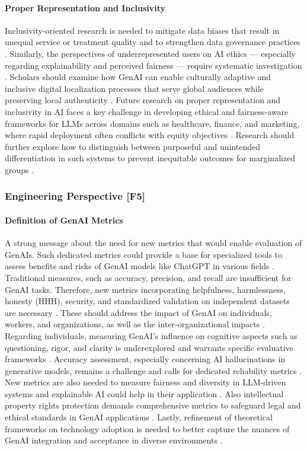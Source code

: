 \paragraph{Proper Representation and Inclusivity}
Inclusivity-oriented research is needed to mitigate data biases that result in unequal service or treatment quality and to strengthen data governance practices \parencite{R01, R09, S11}. Similarly, the perspectives of underrepresented users on AI ethics — especially regarding explainability and perceived fairness — require systematic investigation \parencite{S09}.
Scholars should examine how GenAI can enable culturally adaptive and inclusive digital localization processes that serve global audiences while preserving local authenticity \parencite{R03}. 
Future research on proper representation and inclusivity in AI faces a key challenge in developing ethical and fairness-aware frameworks for LLMs across domains such as healthcare, finance, and marketing, where rapid deployment often conflicts with equity objectives \parencite{R01}. Research should further explore how to distinguish between purposeful and unintended differentiation in such systems to prevent inequitable outcomes for marginalized groups \parencite{R01}.


\subsubsection{Engineering Perspective [F5]}

\paragraph{Definition of GenAI Metrics}
A strong message about the need for new metrics that would enable evaluation of GenAIs. Such dedicated metrics could provide a base for specialized tools to assess benefits and risks of GenAI models like ChatGPT in various fields \parencite{S14}.
Traditional measures, such as accuracy, precision, and recall are insufficient for GenAI tasks. Therefore, new metrics incorporating helpfulness, harmlessness, honesty (HHH), security, and standardized validation on independent datasets are necessary \parencite{R02, S02, S07}.
These should address the impact of GenAI on individuals, workers, and organizations, as well as the inter-organizational impacts \parencite{R10}.
Regarding individuals, measuring GenAI's influence on cognitive aspects such as questioning, rigor, and clarity is underexplored and warrants specific evaluative frameworks \parencite{R06}.
Accuracy assessment, especially concerning AI hallucinations in generative models, remains a challenge and calls for dedicated reliability metrics \parencite{R08}.
New metrics are also needed to measure fairness and diversity in LLM-driven systems \parencite{R01} and explainable AI could help in their application \parencite{S18}.
Also intellectual property rights protection demands comprehensive metrics to safeguard legal and ethical standards in GenAI applications \parencite{R07}.
Lastly, refinement of theoretical frameworks on technology adoption is needed to better capture the nuances of GenAI integration and acceptance in diverse environments \parencite{S13}. 

